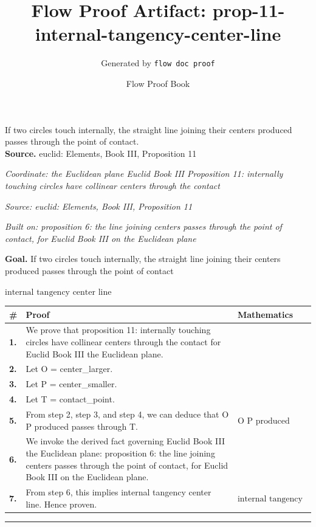 \documentclass[11pt]{article}
\title{Flow Proof Artifact: prop-11-internal-tangency-center-line}
\author{Generated by \texttt{flow doc proof}}
\date{Flow Proof Book}
\theoremstyle{definition}
\begin{document}
\maketitle
If two circles touch internally, the straight line joining their centers produced passes through the point of contact.\\[0.5em]
\textbf{Source.} euclid: Elements, Book III, Proposition 11\\[0.5em]
\bigskip
{}\par
\smallskip\noindent\textit{Coordinate: the Euclidean plane \cdot Euclid Book III \cdot Proposition 11: internally touching circles have collinear centers through the contact}\par
\smallskip\noindent\textit{Source: euclid: Elements, Book III, Proposition 11}\par
\smallskip\noindent\textit{Built on: proposition 6: the line joining centers passes through the point of contact, for Euclid Book III on the Euclidean plane}\par
\medskip
\noindent\textbf{Goal.} If two circles touch internally, the straight line joining their centers produced passes through the point of contact\par
\noindent$\displaystyle \text{internal tangency center line}$\par
\medskip
\noindent
\begin{tabular}{@{} >{\raggedright\arraybackslash}p{} >{\raggedright\arraybackslash}p{} >{\raggedleft\arraybackslash}p{} @{}}
\textbf{\#} & \textbf{Proof} & \textbf{Mathematics} \\
\midrule
\textbf{1.} & We prove that proposition 11: internally touching circles have collinear centers through the contact for Euclid Book III the Euclidean plane. & \\[0.45em]
\textbf{2.} & Let O = center\_larger. & \\[0.45em]
\textbf{3.} & Let P = center\_smaller. & \\[0.45em]
\textbf{4.} & Let T = contact\_point. & \\[0.45em]
\textbf{5.} & From step 2, step 3, and step 4, we can deduce that O P produced passes through T. & $\displaystyle \text{O P produced passes through T}$ \\[0.45em]
\textbf{6.} & We invoke the derived fact governing Euclid Book III the Euclidean plane: proposition 6: the line joining centers passes through the point of contact, for Euclid Book III on the Euclidean plane. & \\[0.45em]
\textbf{7.} & From step 6, this implies internal tangency center line. Hence proven. & $\displaystyle \text{internal tangency center line}$ \\[0.45em]
\bottomrule
\end{tabular}
\label{thm:Geometry-Euclid Book III-proposition_11_internally_touching_circles_have_collinear_centers_through_the_contact}
\par\medskip\hrule
\end{document}
